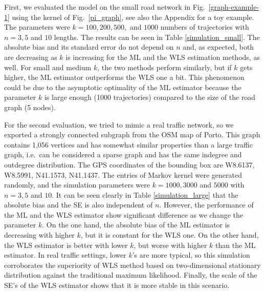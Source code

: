 \documentclass[b5paper,12pt]{report}
\theoremstyle{definition}
\begin{document}
First, we evaluated the model on the small road network in Fig.~\ref{graph-example-1} using the kernel of Fig.~\ref{pi_graph}, see also the Appendix for a toy example. The parameters were $k=100,200,500,$ and $1000$ numbers of trajectories with $n=3,5$ and $10$ lengths. The results can be seen in Table \ref{simulation_small}. The absolute bias and its standard error do not depend on $n$ and, as expected, both are decreasing as $k$ is increasing for the ML and the WLS estimation methods, as well. For small and medium $k$, the two methods perform similarly, but if $k$ gets higher, the ML estimator outperforms the WLS one a bit. This phenomenon could be due to the asymptotic optimality of the ML estimator because the parameter $k$ is large enough (1000 trajectories) compared to the size of the road graph (5 nodes).

For the second evaluation, we tried to mimic a real traffic network, so we exported a strongly connected subgraph from the OSM map of Porto. This graph contains 1,056 vertices and has somewhat similar properties than a large traffic graph, i.e.~can be considered a sparse graph and has the same indegree and outdegree distribution. The GPS coordinates of the bounding box are W8.6137, W8.5991, N41.1573, N41.1437. The entries of Markov kernel were generated randomly, and the simulation parameters were $k=1000,3000$ and $5000$ with $n=3,5$ and $10$. It can be seen clearly in Table \ref{simulation_large} that the absolute bias and the SE is also independent of $n$. However, the performance of the ML and the WLS estimator show significant difference as we change the parameter $k$. On the one hand, the absolute bias of the ML estimator is decreasing with higher $k$, but it is constant for the WLS one. On the other hand, the WLS estimator is better with lower $k$, but worse with higher $k$ than the ML estimator. In real traffic settings, lower $k$'s are more typical, so this simulation corroborates the superiority of WLS method based on two-dimensional stationary distribution against the traditional maximum likelihood. Finally, the scale of the SE's of the WLS estimator shows that it is more stable in this scenario.
\end{document}
